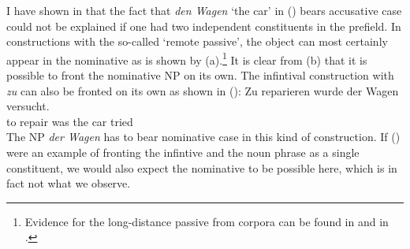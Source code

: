 I have shown in  that the fact that \emph{den Wagen} `the car' in () bears
accusative case could not be explained if one had two independent constituents in the prefield. 
\eal 
{}
\zl
In constructions with the so-called `remote passive', the object can most certainly appear in the
nominative as is shown by (a).\footnote{
       Evidence for the long-distance passive from corpora can be found in  and in .%
}
It is clear from (b) that it is possible to front the nominative NP on its own.
\eal
{}
\zl
The infintival construction with \emph{zu} can also be fronted on its own as shown in ():
\ea
\gll Zu reparieren wurde der Wagen versucht.\\
	 to repair was the car tried\\
\z
The NP \emph{der Wagen} has to bear nominative case in this kind of construction. If () were an example of fronting
the infintive and the noun phrase as a single constituent, we would also expect the nominative to be possible here, which
is in fact not what we observe.




